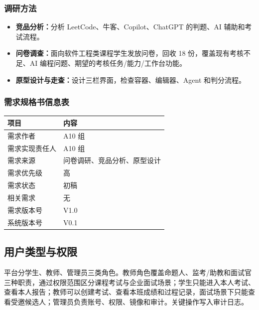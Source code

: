 \documentclass[UTF8,12pt,a4paper]{ctexart}
\begin{document}
\subsubsection{调研方法}

\begin{itemize}[leftmargin=2em]
  \item \textbf{竞品分析：}分析 LeetCode、牛客、Copilot、ChatGPT 的判题、AI 辅助和考试流程。
  \item \textbf{问卷调查：}面向软件工程类课程学生发放问卷，回收 18 份，覆盖现有考核不足、AI 编程问题、期望的考核任务/能力/工作台功能。
  \item \textbf{原型设计与走查：}设计三栏界面，检查容器、编辑器、Agent 和判分流程。
\end{itemize}

\subsubsection{需求规格书信息表}

\begin{table}[H]
\centering
\small
\begin{tabularx}{\textwidth}{|p{4.0cm}|Y|}
\hline
\textbf{项目} & \textbf{内容} \\ \hline
需求作者 & A10 组 \\ \hline
需求实现责任人 & A10 组 \\ \hline
需求来源 & 问卷调研、竞品分析、原型设计 \\ \hline
需求优先级 & 高 \\ \hline
需求状态 & 初稿 \\ \hline
相关需求 & 无 \\ \hline
需求版本号 & V1.0 \\ \hline
系统版本号 & V0.1 \\ \hline
\end{tabularx}
\end{table}

\subsection{用户类型与权限}

平台分学生、教师、管理员三类角色。教师角色覆盖命题人、监考/助教和面试官三种职责，通过权限范围区分课程考试与企业面试场景；学生只能进入本人考试、查看本人报告；教师可以创建考试、查看本班成绩和过程记录，面试场景下只能查看受邀候选人；管理员负责账号、权限、镜像和审计。关键操作写入审计日志。
\end{document}
